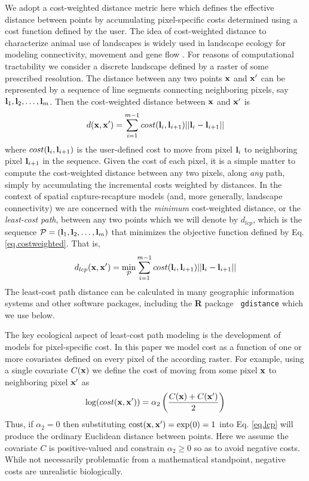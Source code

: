 We adopt a cost-weighted distance metric here which defines the
effective distance between points by accumulating pixel-specific costs
determined using a cost function defined by the user.  The idea of
cost-weighted distance to characterize animal use of landscapes is
widely used in landscape ecology for modeling connectivity, movement
and gene flow \citep{beier_etal:2008}. For reasons of computational
tractability we consider a discrete landscape defined by a raster of
some prescribed resolution. The distance between any two points ${\bf
  x}$ and ${\bf x}'$ can be represented by a sequence of line segments
connecting neighboring pixels, say ${\bf l}_{1},{\bf
  l}_{2},\ldots,{\bf l}_{m}$. Then the cost-weighted distance between
${\bf x}$ and ${\bf x}'$ is
\begin{equation}
 d({\bf x},{\bf x}')
  =  \sum_{i=1}^{m-1} cost({\bf l}_{i},{\bf l}_{i+1})||{\bf l}_{i} - {\bf l}_{i+1}||
\label{eq.costweighted}
\end{equation}
where $cost({\bf l}_{i},{\bf l}_{i+1})$ is the user-defined cost to
move from pixel ${\bf l}_{i}$ to neighboring pixel ${\bf l}_{i+1}$ in
the sequence.  Given the cost of each pixel, it is a simple matter to
compute the cost-weighted distance between any two pixels, along {\it
  any} path, simply by accumulating the incremental costs weighted by
distances.  In the context of spatial capture-recapture models (and,
more generally, landscape connectivity) we are concerned with the {\it
  minimum} cost-weighted distance, or the {\it least-cost path},
between any two points which we will denote by $d_{lcp}$, which is the
sequence ${\cal P} = ({\bf l}_{1},{\bf l}_{2},\ldots,{\bf l}_{m})$
that minimizes the objective function defined by
Eq. \ref{eq.costweighted}. That is,
\begin{equation}
 d_{lcp}({\bf x},{\bf x}')
  =  \min_{{\cal P}} \sum_{i=1}^{m-1} cost({\bf l}_{i},{\bf l}_{i+1})||{\bf l}_{i} - {\bf l}_{i+1}||
\label{eq.lcp}
\end{equation}
The least-cost path distance can be calculated in
 many geographic information systems and other software packages,
including the {\bf R} package \mbox{\tt
  gdistance} \citep{vanetten:2011} which we use below.

The key ecological aspect of least-cost path modeling is the
development
of models for pixel-specific cost.
In this paper we model cost as a function of one or more covariates
defined on every pixel of the according raster. For example, using a
single covariate $C({\bf x})$ we define the cost of moving from some pixel
${\bf x}$ to neighboring pixel ${\bf x}'$ as
\begin{equation}
\log(  cost({\bf x},{\bf x}'))=  \alpha_{2}\left( \frac{C({\bf
      x})+C({\bf x}')}{2}
\right)
\label{ecoldist.eq.cost}
\end{equation}
Thus, if $\alpha_{2} = 0$ then substituting $\mbox{cost}({\bf x},{\bf x}')
=\exp(0) = 1$ into
Eq. \ref{eq.lcp} will produce the ordinary Euclidean distance
between points. Here we assume the covariate $C$ is positive-valued
and constrain $\alpha_{2}\ge 0$ so as to avoid
negative costs. While not necessarily problematic from a mathematical
standpoint, negative costs are unrealistic biologically.


